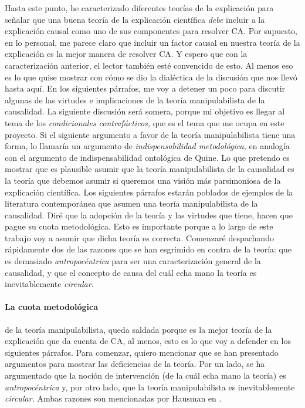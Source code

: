 Hasta este punto, he caracterizado diferentes teorías de la
explicación para señalar que una buena teoría de la
explicación científica \emph{debe} incluir a la explicación
causal como uno de sus componentes para resolver CA. Por
supuesto, en lo personal, me parece claro que incluir un
factor causal en nuestra teoría de la explicación es la
mejor manera de resolver CA. Y espero que con la
caracterización anterior, el lector también esté convencido
de esto. Al menos eso es lo que quise mostrar con cómo se
dio la dialéctica de la discusión que nos llevó hasta aquí.
En los siguientes párrafos, me voy a detener un poco para
discutir algunas de las virtudes e implicaciones de la
teoría manipulabilista de la causalidad. La siguiente
discusión será somera, porque mi objetivo es llegar al tema
de los \emph{condicionales contrafácticos,} que es el tema
que me ocupa en este proyecto. Si el siguiente argumento a
favor de la teoría manipulabilista tiene una forma, lo
llamaría un argumento de \emph{indispensabilidad
metodológica,} en analogía con el argumento de
indispensabilidad ontológica de Quine. Lo que pretendo es
mostrar que es plausible asumir que la teoría
manipulabilista de la causalidad es la teoría que debemos
asumir si queremos una visión más parsimoniosa de la
explicación científica. Los siguientes párrafos estarán
poblados de ejemplos de la literatura contemporánea que
asumen una teoría manipulabilista de la causalidad. Diré que
la adopción de la teoría y las virtudes que tiene, hacen que
pague su cuota metodológica. Esto es importante porque a lo
largo de este trabajo voy a asumir que dicha teoría es
correcta. Comenzaré despachando rápidamente dos de las
razones que se han esgrimido en contra de la teoría: que es
demasiado \emph{antropocéntrica} para ser una
caracterización general de la causalidad, y que el concepto
de causa del cuál echa mano la teoría es inevitablemente
\emph{circular}. 

\paragraph{La cuota metodológica} de la
teoría manipulabilista, queda saldada porque es la mejor
teoría de la explicación que da cuenta de CA, al menos, esto
es lo que voy a defender en los siguientes párrafos. Para
comenzar, quiero mencionar que se han presentado argumentos
para mostrar las deficiencias de la teoría. Por un lado, se
ha argumentado que la noción de intervención (de la cuál
echa mano la teoría) es \emph{antropocéntrica} y, por otro
lado, que la teoría manipulabilista es inevitablemente
\emph{circular.} Ambas razones son mencionadas por Hausman
en .	

